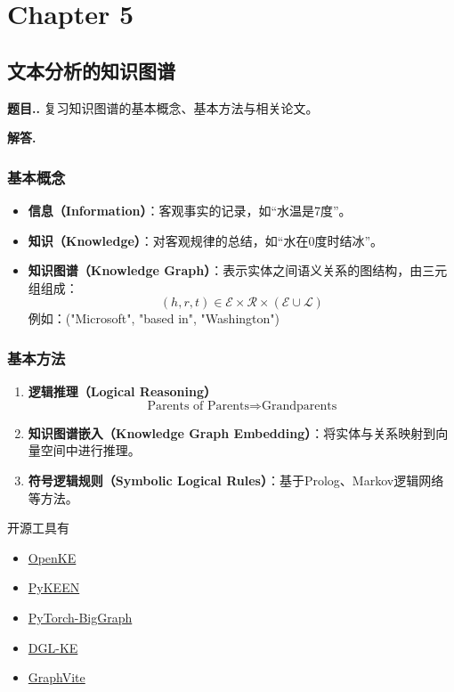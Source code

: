 \documentclass[12pt, a4paper, oneside]{ctexart}
\numberwithin{equation}{section}  %
\newcounter{problem}[subsection]  %
\newenvironment{problem}[1][]{\stepcounter{problem}\par\noindent\textbf{题目\thesubsection.\arabic{problem}. #1}}{\smallskip\par}
\newenvironment{solution}[1][]{\par\noindent\textbf{#1解答. }}{\smallskip\par}  %
\begin{document}
\section{Chapter 5}
\subsection{文本分析的知识图谱}
\begin{problem}
复习知识图谱的基本概念、基本方法与相关论文。
\end{problem}
\begin{solution}
\subsubsection*{基本概念}
\begin{itemize}
  \item \textbf{信息（Information）}：客观事实的记录，如“水温是7度”。
  \item \textbf{知识（Knowledge）}：对客观规律的总结，如“水在0度时结冰”。
  \item \textbf{知识图谱（Knowledge Graph）}：表示实体之间语义关系的图结构，由三元组组成：
  \[
    (h, r, t) \in \mathcal{E} \times \mathcal{R} \times (\mathcal{E} \cup \mathcal{L})
  \]
  例如：("Microsoft", "based in", "Washington")
\end{itemize}

\subsubsection*{基本方法}
\begin{enumerate}[label=(\arabic*)]
  \item \textbf{逻辑推理（Logical Reasoning）}
  \[
    \text{Parents of Parents} \Rightarrow \text{Grandparents}
  \]
  \item \textbf{知识图谱嵌入（Knowledge Graph Embedding）}：将实体与关系映射到向量空间中进行推理。
  \item \textbf{符号逻辑规则（Symbolic Logical Rules）}：基于Prolog、Markov逻辑网络等方法。
\end{enumerate}

开源工具有
\begin{itemize}
  \item \href{https://github.com/thunlp/OpenKE}{OpenKE}
  \item \href{https://github.com/pykeen/pykeen}{PyKEEN}
  \item \href{https://github.com/facebookresearch/PyTorch-BigGraph}{PyTorch-BigGraph}
  \item \href{https://github.com/awslabs/dgl-ke}{DGL-KE}
  \item \href{https://graphvite.io/}{GraphVite}
\end{itemize}


\end{solution}
\end{document}
